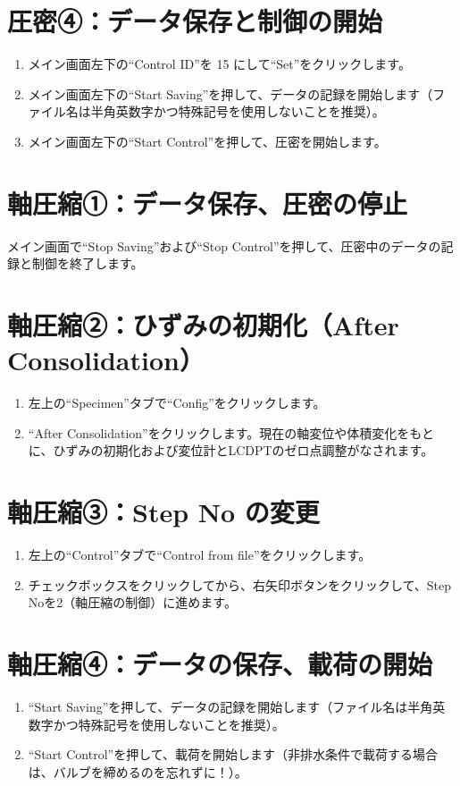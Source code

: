 \section{圧密④：データ保存と制御の開始}
\begin{enumerate}
    \item メイン画面左下の``Control ID''を 15 にして``Set''をクリックします。
    \item メイン画面左下の``Start Saving''を押して、データの記録を開始します（ファイル名は半角英数字かつ特殊記号を使用しないことを推奨）。
    \item メイン画面左下の``Start Control''を押して、圧密を開始します。
\end{enumerate}

\section{軸圧縮①：データ保存、圧密の停止}
メイン画面で``Stop Saving''および``Stop Control''を押して、圧密中のデータの記録と制御を終了します。

\section{軸圧縮②：ひずみの初期化（After Consolidation）}
\begin{enumerate}
    \item 左上の``Specimen''タブで``Config''をクリックします。
    \item ``After Consolidation''をクリックします。現在の軸変位や体積変化をもとに、ひずみの初期化および変位計とLCDPTのゼロ点調整がなされます。
\end{enumerate}

\section{軸圧縮③：Step No の変更}
\begin{enumerate}
    \item 左上の``Control''タブで``Control from file''をクリックします。
    \item チェックボックスをクリックしてから、右矢印ボタンをクリックして、Step Noを2（軸圧縮の制御）に進めます。
\end{enumerate}

\section{軸圧縮④：データの保存、載荷の開始}
\begin{enumerate}
    \item ``Start Saving''を押して、データの記録を開始します（ファイル名は半角英数字かつ特殊記号を使用しないことを推奨）。
    \item ``Start Control''を押して、載荷を開始します（非排水条件で載荷する場合は、バルブを締めるのを忘れずに！）。
\end{enumerate}

